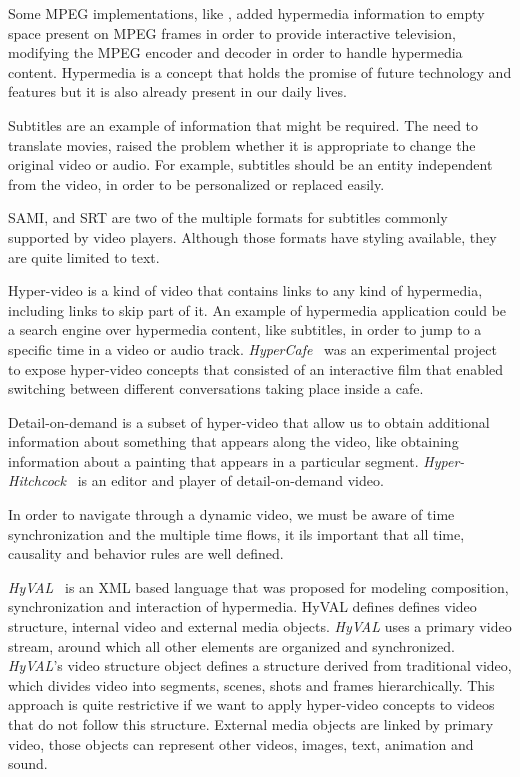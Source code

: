 \documentclass[10pt,conference]{IEEEtran}
\begin{document}
Some \gls{MPEG} implementations, like \cite{embedded}, added hypermedia information to empty space present on \gls{MPEG} frames in order to provide interactive television, modifying the \gls{MPEG} encoder and decoder in order to handle hypermedia content.
Hypermedia is a concept that holds the promise of future technology and features but it is also already present in our daily lives.

  Subtitles are an example of information that might be required.
  The need to translate movies, raised the problem whether it is appropriate to change the original video or audio. For example, subtitles should be an entity independent from the video, in order to be personalized or replaced easily.

  \gls{SAMI}, and \gls{SRT} are two of the multiple formats for subtitles commonly supported by video players. Although those formats have styling available, they are quite limited to text. 

  Hyper-video is a kind of video that contains links to any kind of hypermedia, including links to skip part of it. An example of hypermedia application could be a search engine over hypermedia content, like subtitles, in order to jump to a specific time in a video or audio track. \emph{HyperCafe}~\cite{hypercafe} was an experimental project to expose hyper-video concepts that consisted of an interactive film that enabled switching between different conversations taking place inside a cafe.
 
  Detail-on-demand is a subset of hyper-video that allow us to obtain additional information about something that appears along the video, like obtaining information about a painting that appears in a particular segment. \emph{Hyper-Hitchcock}~\cite{hitchcock} is an editor and player of detail-on-demand video.

  In order to navigate through a dynamic video, we must be aware of time synchronization and the multiple time flows, it ils important that all time, causality and behavior rules are well defined.
  
  \emph{HyVAL}~\cite{hyval} is an \gls{XML} based language that was proposed for modeling composition, synchronization and interaction of hypermedia. HyVAL defines defines video structure, internal video and external media objects. 
  \emph{HyVAL} uses a primary video stream, around which all other elements are organized and synchronized.
  \emph{HyVAL}'s video structure object defines a structure derived from traditional video, which divides video into segments, scenes, shots and frames hierarchically. 
  This approach is quite restrictive if we want to apply hyper-video concepts to videos that do not follow this structure. External media objects are linked by primary video, those objects can represent other videos, images, text, animation and sound.
\end{document}
